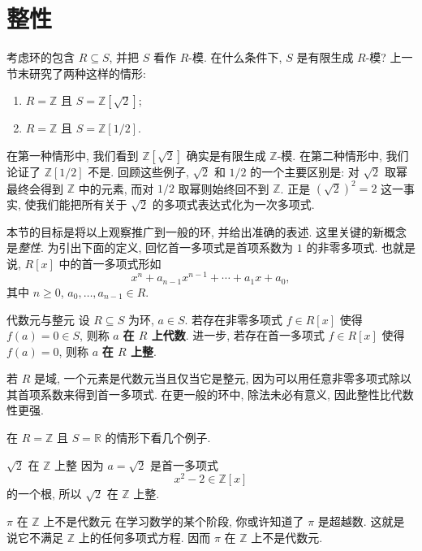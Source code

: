 \section{整性}\label{sec:integrality}

考虑环的包含 $R\subseteq S$, 并把 $S$ 看作 $R$-模. 在什么条件下, $S$ 是有限生成 $R$-模? 上一节末研究了两种这样的情形:
\begin{enumerate}
  \item $R=\mathbb{Z}$ 且 $S=\mathbb{Z}[\sqrt{2}]$;
  \item $R=\mathbb{Z}$ 且 $S=\mathbb{Z}[1/2]$.
\end{enumerate}
在第一种情形中, 我们看到 $\mathbb{Z}[\sqrt{2}]$ 确实是有限生成 $\mathbb{Z}$-模. 在第二种情形中, 我们论证了 $\mathbb{Z}[1/2]$ 不是. 回顾这些例子, $\sqrt{2}$ 和 $1/2$ 的一个主要区别是: 对 $\sqrt{2}$ 取幂最终会得到 $\mathbb{Z}$ 中的元素, 而对 $1/2$ 取幂则始终回不到 $\mathbb{Z}$. 正是 $(\sqrt{2})^{2}=2$ 这一事实, 使我们能把所有关于 $\sqrt{2}$ 的多项式表达式化为一次多项式.

本节的目标是将以上观察推广到一般的环, 并给出准确的表述. 这里关键的新概念是\emph{整性}. 为引出下面的定义, 回忆首一多项式是首项系数为 $1$ 的非零多项式. 也就是说, $R[x]$ 中的首一多项式形如
\[
  x^{n}+a_{n-1}x^{n-1}+\cdots+a_{1}x+a_{0},
\]
其中 $n\geq0$, $a_{0},\ldots,a_{n-1}\in R$.

\begin{Definition}{代数元与整元}\leavevmode\label{def:algebraic-and-integral-elements}
  设 $R\subseteq S$ 为环, $a\in S$. 若存在非零多项式 $f\in R[x]$ 使得 $f(a)=0\in S$, 则称 $a$ \textbf{在 $R$ 上代数}. 进一步, 若存在首一多项式 $f\in R[x]$ 使得 $f(a)=0$, 则称 $a$ \textbf{在 $R$ 上整}.
\end{Definition}

若 $R$ 是域, 一个元素是代数元当且仅当它是整元, 因为可以用任意非零多项式除以其首项系数来得到首一多项式. 在更一般的环中, 除法未必有意义, 因此整性比代数性更强.

在 $R=\mathbb{Z}$ 且 $S=\mathbb{R}$ 的情形下看几个例子.

\begin{Example}{$\sqrt{2}$ 在 $\mathbb{Z}$ 上整}\leavevmode\label{ex:square-root-two-integral}
  因为 $a=\sqrt{2}$ 是首一多项式
  \[
    x^{2}-2\in\mathbb{Z}[x]
  \]
  的一个根, 所以 $\sqrt{2}$ 在 $\mathbb{Z}$ 上整.
\end{Example}

\begin{Example}{$\pi$ 在 $\mathbb{Z}$ 上不是代数元}\leavevmode\label{ex:pi-not-algebraic}
  在学习数学的某个阶段, 你或许知道了 $\pi$ 是超越数. 这就是说它不满足 $\mathbb{Z}$ 上的任何多项式方程. 因而 $\pi$ 在 $\mathbb{Z}$ 上不是代数元.
\end{Example}

